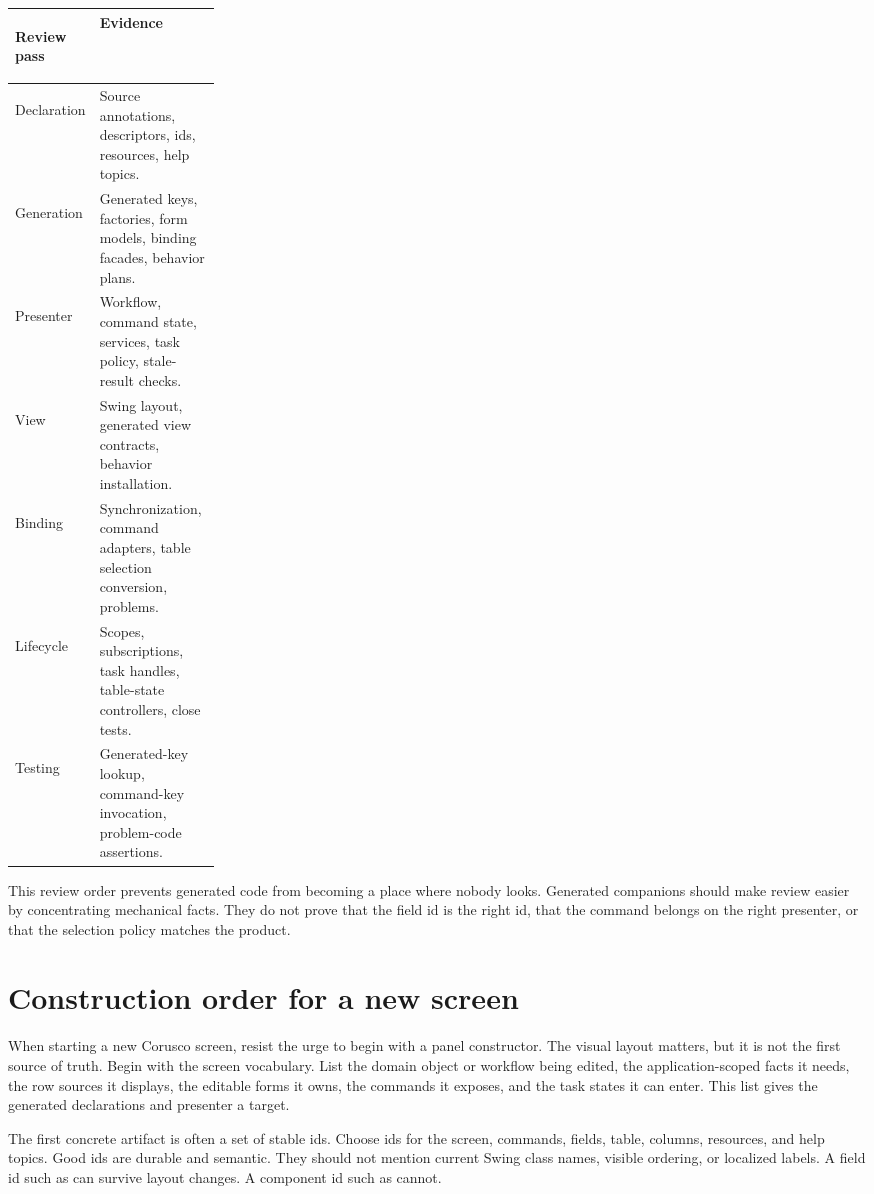 \begin{center}\small
\begin{tabularx}{0.96\linewidth}{>{\bfseries\raggedright\arraybackslash}p{0.24\linewidth}X}
\toprule
Review pass & Evidence\\
\midrule
Declaration & Source annotations, descriptors, ids, resources, help topics.\\
Generation & Generated keys, factories, form models, binding facades, behavior plans.\\
Presenter & Workflow, command state, services, task policy, stale-result checks.\\
View & Swing layout, generated view contracts, behavior installation.\\
Binding & Synchronization, command adapters, table selection conversion, problems.\\
Lifecycle & Scopes, subscriptions, task handles, table-state controllers, close tests.\\
Testing & Generated-key lookup, command-key invocation, problem-code assertions.\\
\bottomrule
\end{tabularx}
\end{center}

This review order prevents generated code from becoming a place where nobody looks. Generated companions should make review easier by concentrating mechanical facts. They do not prove that the field id is the right id, that the command belongs on the right presenter, or that the selection policy matches the product.

\section{Construction order for a new screen}

When starting a new Corusco screen, resist the urge to begin with a panel constructor. The visual layout matters, but it is not the first source of truth. Begin with the screen vocabulary. List the domain object or workflow being edited, the application-scoped facts it needs, the row sources it displays, the editable forms it owns, the commands it exposes, and the task states it can enter. This list gives the generated declarations and presenter a target.

The first concrete artifact is often a set of stable ids. Choose ids for the screen, commands, fields, table, columns, resources, and help topics. Good ids are durable and semantic. They should not mention current Swing class names, visible ordering, or localized labels. A field id such as  can survive layout changes. A component id such as  cannot.

